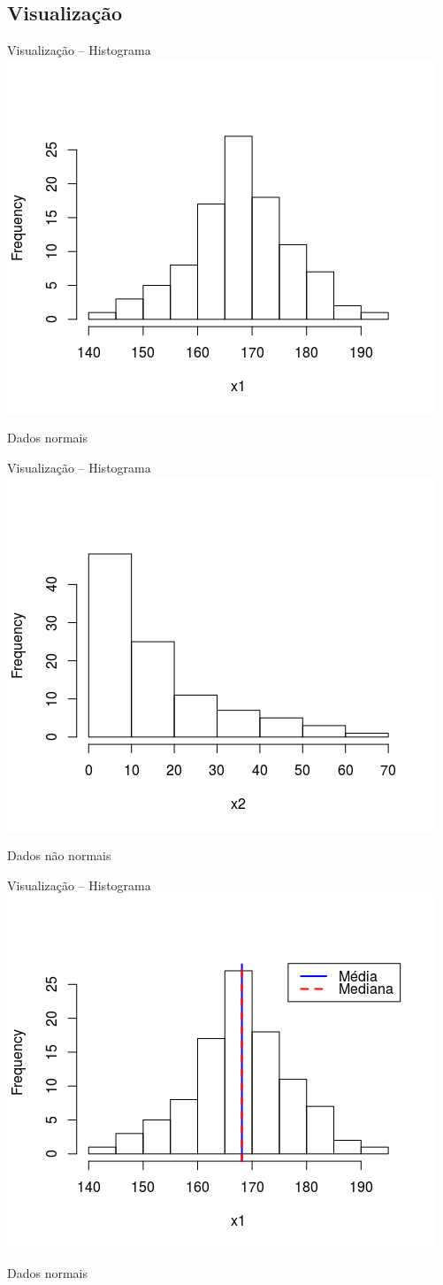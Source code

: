 \documentclass{beamer}
\begin{document}
\subsection{Visualização}

\begin{frame}{\scriptsize Visualização -- Histograma}
  \centering
  \includegraphics[width=.7\textwidth]{Cap37-38/normal1-h}

  Dados normais
\end{frame}

\begin{frame}{\scriptsize Visualização -- Histograma}
  \centering
  \includegraphics[width=.7\textwidth]{Cap37-38/lognormal1-h}

  Dados não normais
\end{frame}

\begin{frame}{\scriptsize Visualização -- Histograma}
  \centering
  \includegraphics[width=.7\textwidth]{Cap37-38/normal2-h}

  Dados normais
\end{frame}
\end{document}
